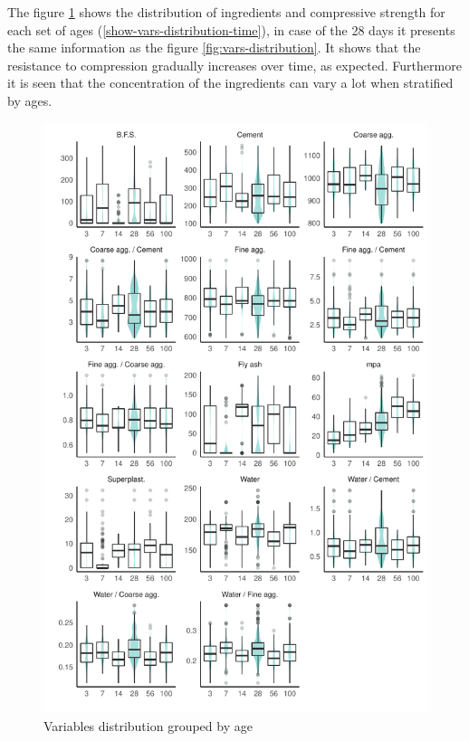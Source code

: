 \documentclass[]{article}
\begin{document}
The figure \ref{fig:vars-distribution-time} shows the distribution of
ingredients and compressive strength for each set of ages
(\ref{show-vars-distribution-time}), in case of the 28 days it presents
the same information as the figure \ref{fig:vars-distribution}. It shows
that the resistance to compression gradually increases over time, as
expected. Furthermore it is seen that the concentration of the
ingredients can vary a lot when stratified by ages.

\begin{figure}

{\centering \includegraphics{CopyOfcapstone_files/figure-latex/vars-distribution-time-1} 

}

\caption{Variables distribution grouped by age}\label{fig:vars-distribution-time}
\end{figure}
\end{document}
